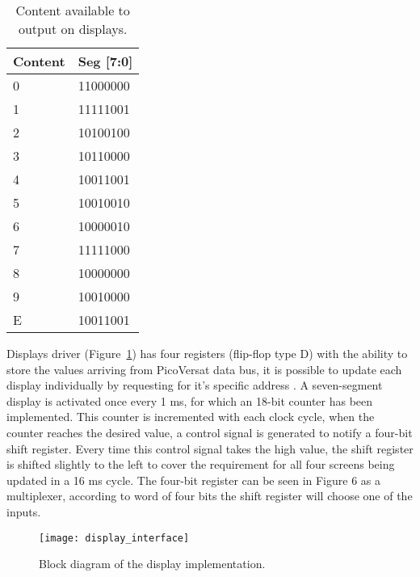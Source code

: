 \vspace{10pt}
\begin{table}[!htbp]
\centering
    \begin{tabular}{|l|l|}
    \hline
    \textbf{Content} & \textbf{Seg {[}7:0{]}} \\ \hline
    0               & 11000000               \\ \hline
    1               & 11111001               \\ \hline
    2               & 10100100               \\ \hline
    3               & 10110000               \\ \hline
    4               & 10011001               \\ \hline
    5               & 10010010               \\ \hline
    6               & 10000010               \\ \hline
    7               & 11111000               \\ \hline
    8               & 10000000               \\ \hline
    9               & 10010000               \\ \hline
    E               & 10011001               \\ \hline
    \end{tabular}
    \caption{Content available to output on displays.}
    \label{tab:disp_values}
\end{table}

\clearpage
\noindent Displays driver (Figure~\ref{fig:display_interface}) has four registers (flip-flop type D) with the ability to store the values arriving from PicoVersat data bus,
it is possible to update each display individually by requesting for it's specific address . A seven-segment display is activated once
every 1 ms, for which an 18-bit counter has been implemented. This counter is incremented with each clock
cycle, when the counter reaches the desired value, a control signal is generated to notify a four-bit shift register.
Every time this control signal takes the high value, the shift register is shifted slightly to the left to cover the
requirement for all four screens being updated in a 16 ms cycle. The four-bit register can be seen in Figure 6
as a multiplexer, according to word of four bits the shift register will choose one of the inputs.

\vspace{10pt}
\begin{figure}[!htbp]
    \centerline{\texttt{[image: display\_interface]}}
    \vspace{0cm}\caption{Block diagram of the display implementation.}
    \label{fig:display_interface}
\end{figure}

